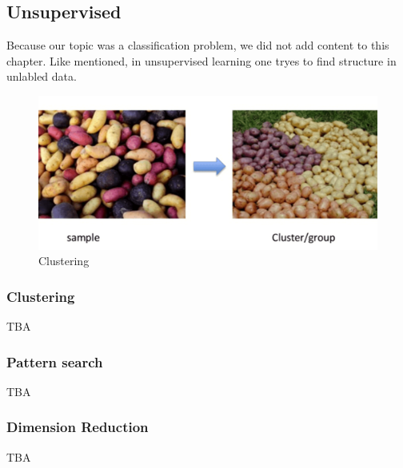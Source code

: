 


\subsection{Unsupervised}

Because our topic was a classification problem, we did not add content to this chapter. Like mentioned, in unsupervised learning one tryes to find structure in unlabled data.

\begin{figure}[hbtp]
	\centering
	\includegraphics[scale=0.5]{cluster}
	\caption{Clustering}
	\label{fig:Datensatz - unbearbeitet}
\end{figure}



\subsubsection{Clustering}
TBA
 

\subsubsection{Pattern search}
TBA

\subsubsection{Dimension Reduction}
TBA

 


\newpage